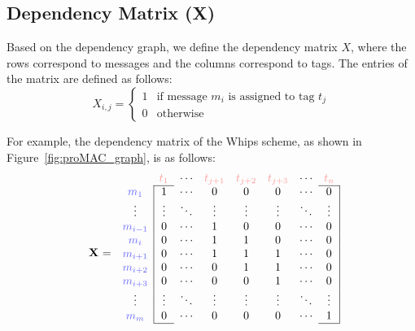 \subsection*{\textbf{Dependency Matrix (X)}}Based on the dependency graph, we define the dependency matrix \( X \), where the rows correspond to messages and the columns correspond to tags. The entries of the matrix are defined as follows:
\begin{equation}
X_{i,j} = 
\begin{cases} 
1 & \text{if message } m_i \text{ is assigned to tag } t_j \\
0 & \text{otherwise}
\end{cases}
\end{equation}

For example, the dependency matrix of the Whips scheme, as shown in Figure~\ref{fig:proMAC_graph}, is as follows:
\setlength{\tabcolsep}{1.9pt}
\renewcommand{\arraystretch}{1.3}
\[
\begin{array}{ccccccccc}
\multirow{12}{*}{\textbf{X} =}& & \textcolor{red!40}{t_1} & \cdots & \textcolor{red!40}{t_{j+1}} & \textcolor{red!40}{t_{j+2}} & \textcolor{red!40}{t_{j+3}}  &  \cdots & \textcolor{red!40}{t_n} \\
\cline{3-3}
\cline{9-9}
&\textcolor{blue!60}{m_1}     & \multicolumn{1}{|c}{1} & \cdots  & 0 & 0 & 0 & \cdots & \multicolumn{1}{c|}{0} \\
&\vdots & \multicolumn{1}{|c}{\vdots} & \ddots & \vdots & \vdots & \vdots & \ddots &  \multicolumn{1}{c|}{\vdots} \\
&\textcolor{blue!60}{m_{i-1}} & \multicolumn{1}{|c}{0} &  \cdots & 1 & 0 & 0 & \cdots & \multicolumn{1}{c|}{0} \\
&\textcolor{blue!60}{m_{i}}   & \multicolumn{1}{|c}{0} &  \cdots & 1 & 1 & 0 & \cdots & \multicolumn{1}{c|}{0} \\
&\textcolor{blue!60}{m_{i+1}} & \multicolumn{1}{|c}{0} &  \cdots & 1 & 1 & 1 & \cdots & \multicolumn{1}{c|}{0} \\
&\textcolor{blue!60}{m_{i+2}} & \multicolumn{1}{|c}{0} &  \cdots & 0 & 1 & 1 & \cdots & \multicolumn{1}{c|}{0} \\
&\textcolor{blue!60}{m_{i+3}} & \multicolumn{1}{|c}{0} &  \cdots & 0 & 0 & 1 & \cdots & \multicolumn{1}{c|}{0} \\
&\vdots & \multicolumn{1}{|c}{\vdots} & \ddots & \vdots & \vdots & \vdots  & \ddots &  \multicolumn{1}{c|}{\vdots} \\
& \textcolor{blue!60}{m_m} & \multicolumn{1}{|c}{0} & \cdots & 0 & 0 & 0 &    \cdots & \multicolumn{1}{c|}{1} \\
\cline{3-3}
\cline{9-9}
\end{array}
\]


